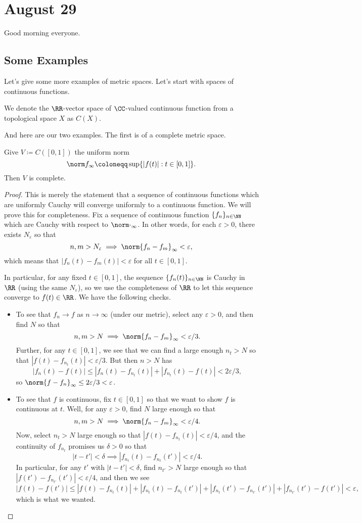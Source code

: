 \documentclass[../notes.tex]{subfiles}
\begin{document}
\section{August 29}

Good morning everyone.

\subsection{Some Examples}
Let's give some more examples of metric spaces. Let's start with spaces of continuous functions.
\begin{definition}
	We denote the $\RR$-vector space of $\CC$-valued continuous function from a topological space $X$ as $C(X)$.
\end{definition}
And here are our two examples. The first is of a complete metric space.
\begin{exe}
	Give $V\coloneqq C([0,1])$ the uniform norm
	\[\norm f_\infty\coloneqq\sup\{|f(t)|:t\in[0,1]\}.\]
	Then $V$ is complete.
\end{exe}
\begin{proof}
	This is merely the statement that a sequence of continuous functions which are uniformly Cauchy will converge uniformly to a continuous function. We will prove this for completeness. Fix a sequence of continuous function $\{f_n\}_{n\in\NN}$ which are Cauchy with respect to $\norm\cdot_\infty$. In other words, for each $\varepsilon>0$, there exists $N_\varepsilon$ so that
	\[n,m>N_\varepsilon\implies\norm{f_n-f_m}_\infty<\varepsilon,\]
	which means that $|f_n(t)-f_m(t)|<\varepsilon$ for all $t\in[0,1]$.

	In particular, for any fixed $t\in[0,1]$, the sequence $\{f_n(t)\}_{n\in\NN}$ is Cauchy in $\RR$ (using the same $N_\varepsilon$), so we use the completeness of $\RR$ to let this sequence converge to $f(t)\in\RR$. We have the following checks.
	\begin{itemize}
		\item To see that $f_n\to f$ as $n\to\infty$ (under our metric), select any $\varepsilon>0$, and then find $N$ so that
		\[n,m>N\implies\norm{f_n-f_m}_\infty<\varepsilon/3.\]
		Further, for any $t\in[0,1]$, we see that we can find a large enough $n_t>N$ so that $|f(t)-f_{n_t}(t)|<\varepsilon/3$. But then $n>N$ has
		\[|f_n(t)-f(t)|\le|f_n(t)-f_{n_t}(t)|+|f_{n_t}(t)-f(t)|<2\varepsilon/3,\]
		so $\norm{f-f_n}_\infty\le2\varepsilon/3<\varepsilon$.
		\item To see that $f$ is continuous, fix $t\in[0,1]$ so that we want to show $f$ is continuous at $t$. Well, for any $\varepsilon>0$, find $N$ large enough so that
		\[n,m>N\implies\norm{f_n-f_m}_\infty<\varepsilon/4.\]
		Now, select $n_t>N$ large enough so that $|f(t)-f_{n_t}(t)|<\varepsilon/4$, and the continuity of $f_{n_t}$ promises us $\delta>0$ so that
		\[|t-t'|<\delta\implies|f_{n_t}(t)-f_{n_t}(t')|<\varepsilon/4.\]
		In particular, for any $t'$ with $|t-t'|<\delta$, find $n_{t'}>N$ large enough so that $|f(t')-f_{n_{t'}}(t')|<\varepsilon/4$, and then we see
		\[|f(t)-f(t')|\le|f(t)-f_{n_t}(t)|+|f_{n_t}(t)-f_{n_{t}}(t')|+|f_{n_t}(t')-f_{n_{t'}}(t')|+|f_{n_{t'}}(t')-f(t')|<\varepsilon,\]
		which is what we wanted.
		\qedhere
	\end{itemize}
\end{proof}
\end{document}

